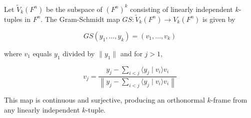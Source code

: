 Let $\tilde{V}_k(F^n)$ be the subspace of $(F^n)^k$ consisting of linearly independent $k$-tuples in $F^n$. The Gram-Schmidt map $GS: \tilde{V}_k(F^n) \to V_k(F^n)$ is given by

$$GS(y_1, \ldots, y_k) = (v_1, \ldots, v_k)$$

where $v_1$ equals $y_1$ divided by $\|y_1\|$ and for $j > 1$,

$$v_j = \frac{y_j - \sum_{i < j} \langle y_j \mid v_i \rangle v_i}{\left\| y_j - \sum_{i < j} \langle y_j \mid v_i \rangle v_i \right\|}$$

This map is continuous and surjective, producing an orthonormal $k$-frame from any linearly independent $k$-tuple.

